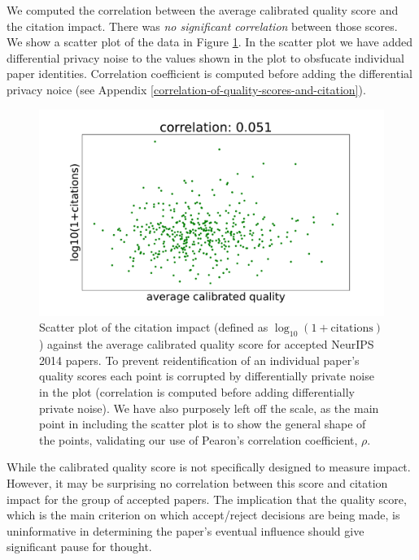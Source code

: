 \documentclass[twoside]{article}
\begin{document}
We computed the correlation between the average calibrated quality score and the citation impact. There was \emph{no significant correlation} between those scores. We show a scatter plot of the data in Figure \ref{figure-citations-vs-average-calibrated-quality-accept}. In the scatter plot we have added differential privacy noise to the values shown in the plot to obsfucate individual paper identities. Correlation coefficient is computed before adding the differential privacy noice (see Appendix \ref{correlation-of-quality-scores-and-citation}).

\begin{figure}[htb]
  \begin{center}
    \includegraphics[width=0.9\columnwidth]{diagrams/neurips/citations-vs-average-calibrated-quality-accept.pdf}
  \end{center}
  \caption{Scatter plot of the citation impact (defined as $\log_{10}(1+\text{citations})$) against the average calibrated quality score for accepted NeurIPS 2014 papers. To prevent reidentification of an individual paper's quality scores each point is corrupted by differentially private noise in the plot (correlation is computed before adding differentially private noise). We have also purposely left off the scale, as the main point in including the scatter plot is to show the general shape of the points, validating our use of Pearon's correlation coefficient, $\rho$.}
  \label{figure-citations-vs-average-calibrated-quality-accept}
\end{figure}

While the calibrated quality score is not specifically designed to measure impact. However, it may be surprising no correlation between this score and citation impact for the group of accepted papers. The implication that the quality score, which is the main criterion on which accept/reject decisions are being made, is uninformative in determining the paper's eventual influence should give significant pause for thought.
\end{document}
